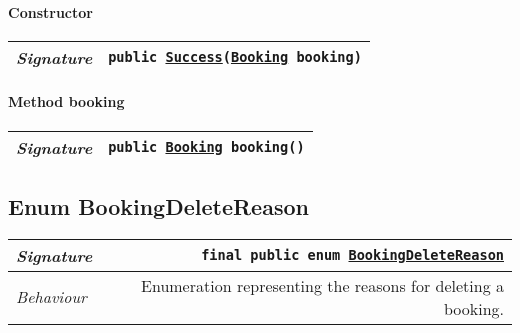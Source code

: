 \begin{adjustwidth}{1.5em}{0pt}
\begin{adjustwidth}{1.5em}{0pt}
\begin{adjustwidth}{1.5em}{0pt}
{\begin{tabularx}{1.0\linewidth}{@{}l R@{}}
      \end{tabularx}}\paragraph{Constructor\label{edu.kit.hci.soli.dto.BookingAttemptResult.Success@edu.kit.hci.soli.dto.BookingAttemptResult.Success(edu.kit.hci.soli.domain.Booking)}}
      \begin{adjustwidth}{1.5em}{0pt}
        {\begin{tabularx}{1.0\linewidth}{@{}l R@{}}
          \emph{Signature} & \texttt{public \texttt{\hyperref[edu.kit.hci.soli.dto.BookingAttemptResult.Success]{\texttt{Success}}}(\texttt{\hyperref[edu.kit.hci.soli.domain.Booking]{\texttt{Booking}}} booking)} \\
          \hline
  
        \end{tabularx}}
      \end{adjustwidth}\paragraph{Method booking\label{edu.kit.hci.soli.dto.BookingAttemptResult.Success@booking()}}
      \begin{adjustwidth}{1.5em}{0pt}
        {\begin{tabularx}{1.0\linewidth}{@{}l R@{}}
          \emph{Signature} & \texttt{public \texttt{\hyperref[edu.kit.hci.soli.domain.Booking]{\texttt{Booking}}} booking()} \\
          \hline
  
        \end{tabularx}}
      \end{adjustwidth}
    \end{adjustwidth}
  \end{adjustwidth}\subsection{Enum BookingDeleteReason\label{edu.kit.hci.soli.dto.BookingDeleteReason} }
  \begin{adjustwidth}{1.5em}{0pt}
    {\begin{tabularx}{1.0\linewidth}{@{}l R@{}}
      \emph{Signature} & \texttt{final public  enum \texttt{\hyperref[edu.kit.hci.soli.dto.BookingDeleteReason]{\texttt{BookingDeleteReason}}}} \\
      \hline
      \emph{Behaviour} & Enumeration representing the reasons for deleting a booking.  \\
      \hline
  

\end{tabularx}}
\end{adjustwidth}
\end{adjustwidth}
